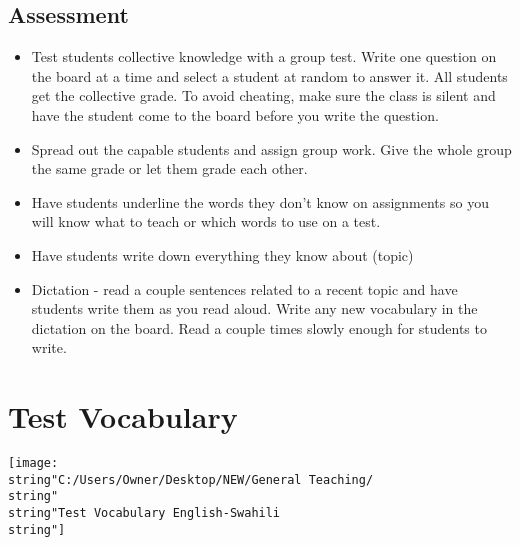 \subsection{Assessment}
\begin{itemize}
\item Test students collective knowledge with a group test. Write one question
on the board at a time and select a student at random to answer it.
All students get the collective grade. To avoid cheating, make sure
the class is silent and have the student come to the board before
you write the question. 
\item Spread out the capable students and assign group work. Give the whole
group the same grade or let them grade each other. 
\item Have students underline the words they don't know on assignments so
you will know what to teach or which words to use on a test.
\item Have students write down everything they know about (topic)
\item Dictation - read a couple sentences related to a recent topic and
have students write them as you read aloud. Write any new vocabulary
in the dictation on the board. Read a couple times slowly enough for
students to write.
\end{itemize}

\section*{Test Vocabulary}

\texttt{[image: \\string"C:/Users/Owner/Desktop/NEW/General Teaching/\\string"\\string"Test Vocabulary English-Swahili\\string"]}


